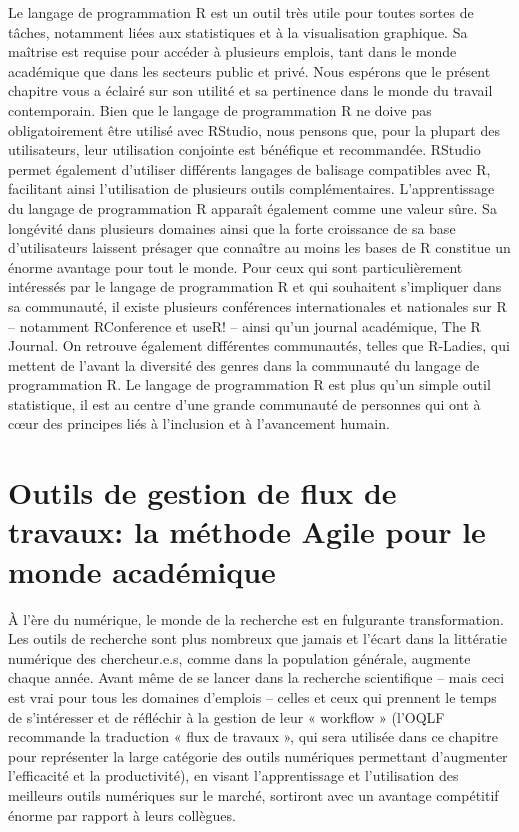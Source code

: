\documentclass[
  letterpaper,
  DIV=11,
  numbers=noendperiod]{scrreprt}
\begin{document}
Le langage de programmation R est un outil très utile pour toutes sortes
de tâches, notamment liées aux statistiques et à la visualisation
graphique. Sa maîtrise est requise pour accéder à plusieurs emplois,
tant dans le monde académique que dans les secteurs public et privé.
Nous espérons que le présent chapitre vous a éclairé sur son utilité et
sa pertinence dans le monde du travail contemporain. Bien que le langage
de programmation R ne doive pas obligatoirement être utilisé avec
RStudio, nous pensons que, pour la plupart des utilisateurs, leur
utilisation conjointe est bénéfique et recommandée. RStudio permet
également d'utiliser différents langages de balisage compatibles avec R,
facilitant ainsi l'utilisation de plusieurs outils complémentaires.
L'apprentissage du langage de programmation R apparaît également comme
une valeur sûre. Sa longévité dans plusieurs domaines ainsi que la forte
croissance de sa base d'utilisateurs laissent présager que connaître au
moins les bases de R constitue un énorme avantage pour tout le monde.
Pour ceux qui sont particulièrement intéressés par le langage de
programmation R et qui souhaitent s'impliquer dans sa communauté, il
existe plusieurs conférences internationales et nationales sur R --
notamment RConference et useR! -- ainsi qu'un journal académique, The R
Journal. On retrouve également différentes communautés, telles que
R-Ladies, qui mettent de l'avant la diversité des genres dans la
communauté du langage de programmation R. Le langage de programmation R
est plus qu'un simple outil statistique, il est au centre d'une grande
communauté de personnes qui ont à cœur des principes liés à l'inclusion
et à l'avancement humain.


\chapter{Outils de gestion de flux de travaux: la méthode Agile pour le
monde académique}\label{sec-chap3}

À l'ère du numérique, le monde de la recherche est en fulgurante
transformation. Les outils de recherche sont plus nombreux que jamais et
l'écart dans la littératie numérique des chercheur.e.s, comme dans la
population générale, augmente chaque année. Avant même de se lancer dans
la recherche scientifique -- mais ceci est vrai pour tous les domaines
d'emplois -- celles et ceux qui prennent le temps de s'intéresser et de
réfléchir à la gestion de leur « workflow » (l'OQLF recommande la
traduction « flux de travaux », qui sera utilisée dans ce chapitre pour
représenter la large catégorie des outils numériques permettant
d'augmenter l'efficacité et la productivité), en visant l'apprentissage
et l'utilisation des meilleurs outils numériques sur le marché,
sortiront avec un avantage compétitif énorme par rapport à leurs
collègues.
\end{document}
